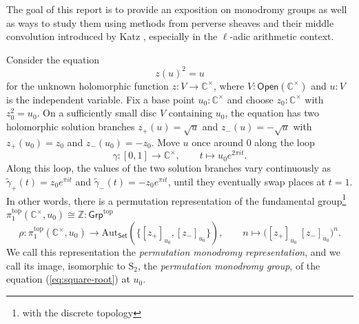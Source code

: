 \documentclass[11pt,letterpaper]{article}
\theoremstyle{numberfirstplain}
\numberwithin{equation}{theorem}
\theoremstyle{numberfirstupright}
\begin{document}
The goal of this report is to provide an exposition on monodromy groups as well as ways to study them using methods from perverse sheaves and their middle convolution introduced by Katz \cite{Katz1996}, especially in the $\ell$-adic arithmetic context.

Consider the equation
\begin{equation}\label{eq:square-root}
z(u)^2=u
\end{equation}
for the unknown holomorphic function $z:V\rightarrow\mathbb C^\times$, where $V:\mathsf{Open}(\mathbb C^\times)$ and $u:V$ is the independent variable. Fix a base point $u_0:\mathbb C^\times$ and choose $z_0:\mathbb C^\times$ with $z_0^2=u_0$.
On a sufficiently small disc $V$ containing $u_0$, the equation has two holomorphic solution branches $z_+(u)=\sqrt{u}$ and $z_-(u)=-\sqrt{u}$ with $z_+(u_0)=z_0$ and $z_-(u_0)=-z_0$. Move $u$ once around $0$ along the loop
$$\gamma:[0,1]\rightarrow\mathbb C^\times,\qquad t\mapsto u_0e^{2\pi i t}.$$
Along this loop, the values of the two solution branches vary continuously as $\widetilde\gamma_+(t)=z_0e^{\pi i t}$ and $\widetilde\gamma_-(t)=-z_0e^{\pi i t}$, until they eventually swap places at $t=1$.  
In other words, there is a permutation representation of the fundamental group\footnote{with the discrete topology} $\pi^{\mathrm{top}}_1(\mathbb C^\times,u_0)\cong\mathbb Z:\mathsf{Grp}^{\mathrm{top}}$
$$\rho:\pi^{\mathrm{top}}_1(\mathbb C^\times,u_0)\rightarrow\mathrm{Aut}_{\mathsf{Set}}(\{[z_+]_{u_0},[z_-]_{u_0}\}),\qquad n\mapsto \bigl([z_+]_{u_0}\ [z_-]_{u_0}\bigr)^n.$$
We call this representation the \textit{permutation monodromy representation}, and we call its image, isomorphic to $\mathrm{S}_2$, the \textit{permutation monodromy group}, of the equation (\cref{eq:square-root}) at $u_0$.
\end{document}
